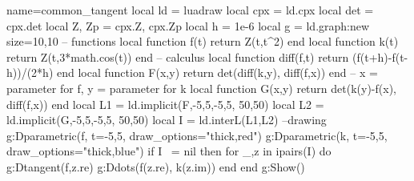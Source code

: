 \documentclass{standalone}
\begin{document}
\begin{luadraw}{name=common_tangent}
local ld = luadraw
local cpx = ld.cpx
local det = cpx.det
local Z, Zp = cpx.Z, cpx.Zp
local h = 1e-6
local g = ld.graph:new{  size={10,10} }
-- functions
local function f(t) return Z(t,t^2) end
local function k(t) return Z(t,3*math.cos(t)) end
-- calculus
local function diff(f,t) return (f(t+h)-f(t-h))/(2*h) end
local function F(x,y) return det(diff(k,y), diff(f,x)) end -- x = parameter for f, y = parameter for k
local function G(x,y) return det(k(y)-f(x), diff(f,x)) end
local L1 = ld.implicit(F,-5,5,-5,5, {50,50})
local L2 = ld.implicit(G,-5,5,-5,5, {50,50})
local I = ld.interL(L1,L2)
--drawing
g:Dparametric(f, {t={-5,5}, draw_options="thick,red"})
g:Dparametric(k, {t={-5,5}, draw_options="thick,blue"})
if I ~= nil then 
    for _,z in ipairs(I) do
        g:Dtangent(f,z.re)
        g:Ddots({f(z.re), k(z.im)})
    end
end
g:Show()
\end{luadraw}
\end{document}
